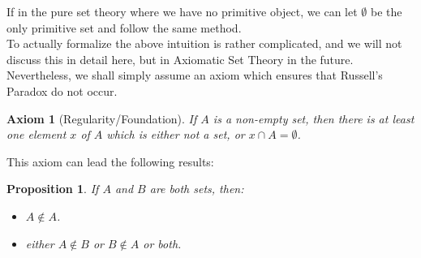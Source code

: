 \documentclass[a4paper]{book}
\theoremstyle{break}
\newtheorem{axiom}{Axiom}[chapter]
\newtheorem{proposition}{Proposition}[section]
\begin{document}
			If in the pure set theory where we have no primitive object, we can let $\emptyset$ be the only primitive set and follow the same method.\\
			To actually formalize the above intuition is rather complicated, and we will not discuss this in detail here, but in Axiomatic Set Theory in the future. Nevertheless, we shall simply assume an axiom which ensures that Russell's Paradox do not occur.
			\begin{axiom}[Regularity/Foundation]
				If $A$ is a non-empty set, then there is at least one element $x$ of $A$ which is either not a set, or $x\cap A=\emptyset$.
			\end{axiom}
			This axiom can lead the following results:
			\begin{proposition}
				\label{lemma from axiom of foundation}
				If $A$ and $B$ are both sets, then:
				\begin{itemize}
					\item $A\notin A$.
					\item either $A\notin B$ or $B\notin A$ or both.
				\end{itemize}
			\end{proposition}
\end{document}
